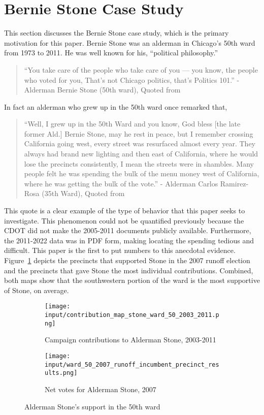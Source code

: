 \section{Bernie Stone Case Study}\label{sec:case_study}
This section discusses the Bernie Stone case study, which is the primary motivation for this paper.
Bernie Stone was an alderman in Chicago's 50th ward from 1973 to 2011.
He was well known for his, ``political philosophy.''

\begin{quotation}
    ``You take care of the people who take care of you — you know, the people who voted for you, That’s not Chicago politics, that’s Politics 101.'' - Alderman Bernie Stone (50th ward), Quoted from~\cite{BGA_berniequote}
\end{quotation}

In fact an alderman who grew up in the 50th ward once remarked that,

\begin{quotation}
    ``Well, I grew up in the 50th Ward and you know, God bless [the late former Ald.] Bernie Stone, may he rest in peace, but I remember crossing California going west, every street was resurfaced almost every year. They always had brand new lighting and then east of California, where he would lose the precincts consistently, I mean the streets were in shambles. Many people felt he was spending the bulk of the menu money west of California, where he was getting the bulk of the vote.'' - Alderman Carlos Ramirez-Rosa (35th Ward), Quoted from~\cite{ramirezrosaquote}
\end{quotation}

This quote is a clear example of the type of behavior that this paper seeks to investigate.
This phenomenon could not be quantified previously because the CDOT did not make the 2005-2011 documents publicly available. 
Furthermore, the 2011-2022 data was in PDF form, making locating the spending tedious and difficult.
This paper is the first to put numbers to this anecdotal evidence.
Figure~\ref{fig:stone_support_maps} depicts the precincts that supported Stone in the 2007 runoff election and the precincts that gave Stone the most individual contributions.
Combined, both maps show that the southwestern portion of the ward is the most supportive of Stone, on average.
\begin{figure}[H]
    \centering
    \begin{subfigure}[b]{0.45\textwidth} %
    \texttt{[image: input/contribution\_map\_stone\_ward\_50\_2003\_2011.png]}
    \caption{Campaign contributions to Alderman Stone, 2003-2011}
    \end{subfigure}
    \hfill %
    \begin{subfigure}[b]{0.45\textwidth}
    \texttt{[image: input/ward\_50\_2007\_runoff\_incumbent\_precinct\_results.png]}
    \caption{Net votes for Alderman Stone, 2007}
    \end{subfigure}
    \caption{Alderman Stone's support in the 50th ward}
    \label{fig:stone_support_maps}
\end{figure}

